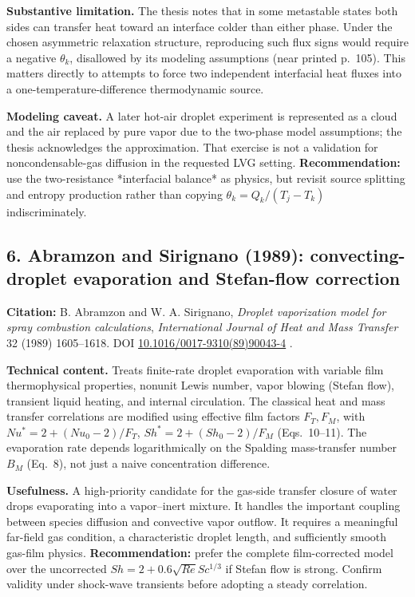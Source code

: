 \documentclass[11pt,letterpaper]{article}
\begin{document}
\textbf{Substantive limitation.} The thesis notes that in some metastable states both sides can transfer heat toward an interface colder than either phase. Under the chosen asymmetric relaxation structure, reproducing such flux signs would require a negative $\theta_k$, disallowed by its modeling assumptions (near printed p.~105). This matters directly to attempts to force two independent interfacial heat fluxes into a one-temperature-difference thermodynamic source.

\textbf{Modeling caveat.} A later hot-air droplet experiment is represented as a cloud and the air replaced by pure vapor due to the two-phase model assumptions; the thesis acknowledges the approximation. That exercise is not a validation for noncondensable-gas diffusion in the requested LVG setting. \textbf{Recommendation:} use the two-resistance *interfacial balance* as physics, but revisit source splitting and entropy production rather than copying $\theta_k=Q_k/(T_j-T_k)$ indiscriminately.

\subsection{6. Abramzon and Sirignano (1989): convecting-droplet evaporation and Stefan-flow correction}
\textbf{Citation:} B. Abramzon and W. A. Sirignano, \emph{Droplet vaporization model for spray combustion calculations}, \emph{International Journal of Heat and Mass Transfer} 32 (1989) 1605--1618. DOI \href{https://doi.org/10.1016/0017-9310(89)90043-4}{10.1016/0017-9310(89)90043-4} \cite{AbramzonSirignano1989}.

\textbf{Technical content.} Treats finite-rate droplet evaporation with variable film thermophysical properties, nonunit Lewis number, vapor blowing (Stefan flow), transient liquid heating, and internal circulation. The classical heat and mass transfer correlations are modified using effective film factors $F_T,F_M$, with $Nu^*=2+(Nu_0-2)/F_T$, $Sh^*=2+(Sh_0-2)/F_M$ (Eqs.~10--11). The evaporation rate depends logarithmically on the Spalding mass-transfer number $B_M$ (Eq.~8), not just a naive concentration difference.

\textbf{Usefulness.} A high-priority candidate for the gas-side transfer closure of water drops evaporating into a vapor--inert mixture. It handles the important coupling between species diffusion and convective vapor outflow. It requires a meaningful far-field gas condition, a characteristic droplet length, and sufficiently smooth gas-film physics. \textbf{Recommendation:} prefer the complete film-corrected model over the uncorrected $Sh=2+0.6\sqrt{Re}Sc^{1/3}$ if Stefan flow is strong. Confirm validity under shock-wave transients before adopting a steady correlation.
\end{document}
